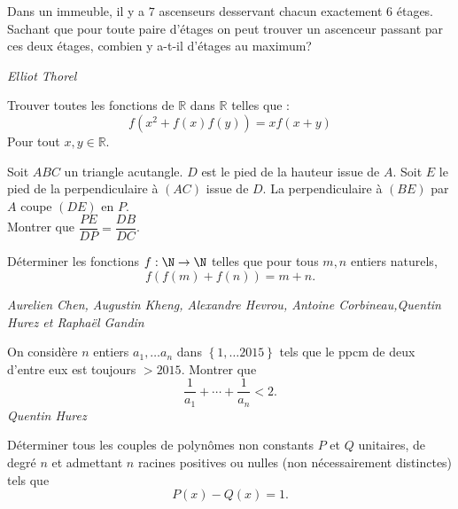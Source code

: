 \begin{exo}{}
Dans un immeuble, il y a $7$ ascenseurs desservant chacun exactement $6$ étages. Sachant que pour toute paire d'étages on peut trouver un ascenceur passant par ces deux étages, combien y a-t-il d'étages au maximum?

\medskip
\textit{Elliot Thorel}

\end{exo}



\begin{exo}{}
Trouver toutes les fonctions de $\mathbb{R}$ dans $\mathbb{R}$ telles que :
$$f(x^2+f(x)f(y))=xf(x+y)$$
Pour tout $x,y\in \mathbb{R}$.
\end{exo}



\begin{exo}{}
Soit $ABC$ un triangle acutangle. $D$ est le pied de la hauteur issue de $A$. Soit $E$ le
pied de la perpendiculaire à $(AC)$ issue de $D$. La perpendiculaire à $(BE)$ par $A$ coupe $(DE)$ en $P$. \\
Montrer que $\dfrac{PE}{DP}=\dfrac{DB}{DC}$.
\end{exo}


\begin{exo}{}
Déterminer les fonctions $f : \N \rightarrow \N$ telles que pour tous $m,n$ entiers naturels, $$f(f(m)+f(n))=m+n.$$

\medskip
\textit{Aurelien Chen, Augustin Kheng, Alexandre Hevrou, Antoine Corbineau,Quentin Hurez et Raphaël Gandin}

\end{exo}

\begin{exo}{}
On considère $n$ entiers $a_{1},\ldots a_{n}$
dans $\left\{ 1,\ldots2015\right\} $ tels que le ppcm de deux d'entre
eux est toujours $>2015$. Montrer que
\[
\frac{1}{a_{1}}+\cdots+\frac{1}{a_{n}}<2.
\]
\medskip
\textit{Quentin Hurez}

\end{exo}

\begin{exo}{}Déterminer tous les couples de polynômes non constants $P$ et $Q$ unitaires, de degré $n$ et admettant $n$ racines positives ou nulles (non nécessairement distinctes) tels que
$$P(x) - Q(x) = 1.$$
\end{exo}

